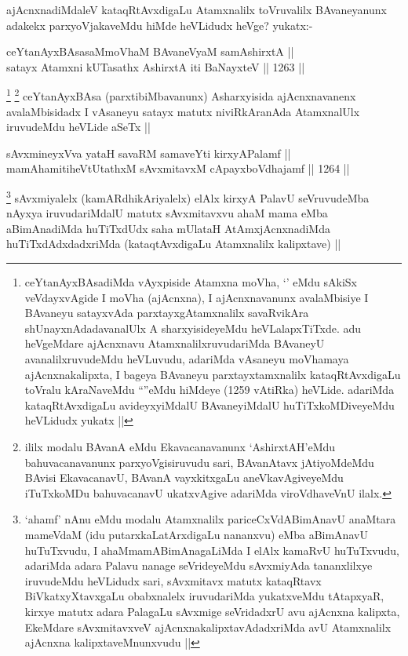 \begin{artha}
ajAcnxnadiMdaleV kataqRtAvxdigaLu Atamxnalilx toVruvalilx BAvaneyanunx adakekx parxyoVjakaveMdu hiMde heVLidudx heVge? yukatx:-
\end{artha}

\begin{shl}
ceYtanAyxBAsasaMmoVhaM BAvaneVyaM samAshirxtA || \\
satayx Atamxni kUTasathx AshirxtA iti BaNayxteV ||  1263 ||  
\end{shl}

\begin{artha}
\footnote{ceYtanAyxBAsadiMda vAyxpiside Atamxna moVha, `\stext' eMdu sAkiSx veVdayxvAgide I moVha (ajAcnxna), I ajAcnxnavanunx avalaMbisiye I BAvaneyu satayxvAda parxtayxgAtamxnalilx savaRvikAra shUnayxnAdadavanalUlx A sharxyisideyeMdu heVLalapxTiTxde. adu heVgeMdare ajAcnxnavu AtamxnalilxruvudariMda BAvaneyU avanalilxruvudeMdu heVLuvudu, adariMda vAsaneyu moVhamaya ajAcnxnakalipxta, I bageya BAvaneyu parxtayxtamxnalilx kataqRtAvxdigaLu toVralu kAraNaveMdu ``\stext''eMdu hiMdeye (1259 vAtiRka) heVLide. adariMda kataqRtAvxdigaLu avideyxyiMdalU BAvaneyiMdalU huTiTxkoMDiveyeMdu heVLidudx yukatx ||}
\footnote{ililx modalu BAvanA eMdu Ekavacanavanunx `AshirxtAH'eMdu bahuvacanavanunx parxyoVgisiruvudu sari, BAvanAtavx jAtiyoMdeMdu BAvisi EkavacanavU, BAvanA vayxkitxgaLu aneVkavAgiveyeMdu iTuTxkoMDu bahuvacanavU ukatxvAgive adariMda viroVdhaveVnU ilalx.}
ceYtanAyxBAsa (parxtibiMbavanunx) Asharxyisida ajAcnxnavanenx avalaMbisidadx I vAsaneyu satayx matutx niviRkAranAda AtamxnalUlx iruvudeMdu heVLide aSeTx ||
\end{artha}


\begin{shl}
sAvxmineyxVva yataH savaRM samaveYti kirxyAPalamf || \\
mamAhamitiheVtUtathxM sAvxmitavxM cApayxboVdhajamf ||  1264 ||  
\end{shl}

\begin{artha}
\footnote{`ahamf' nAnu eMdu modalu Atamxnalilx pariceCxVdABimAnavU anaMtara mameVdaM (idu putarxkaLatArxdigaLu nananxvu) eMba aBimAnavU huTuTxvudu, I ahaMmamABimAnagaLiMda I elAlx kamaRvU huTuTxvudu, adariMda adara Palavu nanage seVrideyeMdu sAvxmiyAda tananxlilxye iruvudeMdu heVLidudx sari, sAvxmitavx matutx kataqRtavx BiVkatxyXtavxgaLu obabxnalelx iruvudariMda yukatxveMdu tAtapxyaR, kirxye matutx adara PalagaLu sAvxmige seVridadxrU avu ajAcnxna kalipxta, EkeMdare sAvxmitavxveV ajAcnxnakalipxtavAdadxriMda avU Atamxnalilx ajAcnxna kalipxtaveMnunxvudu ||}
sAvxmiyalelx (kamARdhikAriyalelx) elAlx kirxyA PalavU seVruvudeMba nAyxya iruvudariMdalU matutx sAvxmitavxvu ahaM mama eMba aBimAnadiMda huTiTxdUdx saha mUlataH AtAmxjAcnxnadiMda huTiTxdAdxdadxriMda (kataqtAvxdigaLu Atamxnalilx kalipxtave) ||
\end{artha}

